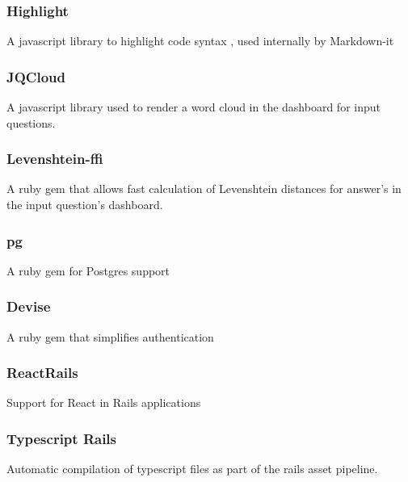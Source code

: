 \subsubsection{Highlight}
A javascript library to highlight code syntax , used internally by Markdown-it
	
\subsubsection{JQCloud}
A javascript library used to render a word cloud in the dashboard for input questions.

\subsubsection{Levenshtein-ffi}
A ruby gem that allows fast calculation of Levenshtein distances for answer's in the input question's dashboard.

\subsubsection{pg}
A ruby gem for Postgres support

\subsubsection{Devise}
A ruby gem that simplifies authentication

\subsubsection{ReactRails}
Support for React in Rails applications

\subsubsection{Typescript Rails}
Automatic compilation of typescript files as part of the rails asset pipeline.

